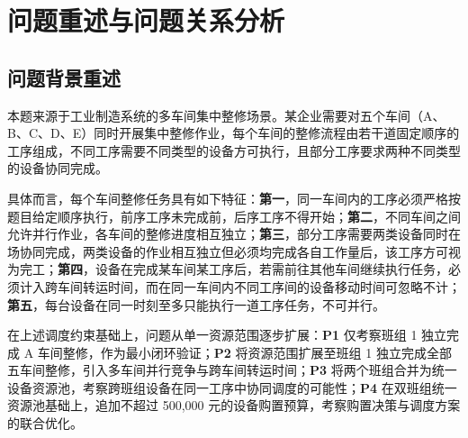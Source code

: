 \documentclass[UTF8,a4paper,12pt]{ctexart}
\newcommand{\papertitle}[1]{%
  \begin{center}
    {\heiti\zihao{3} #1}
  \end{center}
  \vspace{1em}
}
\begin{document}






\section{问题重述与问题关系分析}

\subsection{问题背景重述}
本题来源于工业制造系统的多车间集中整修场景。某企业需要对五个车间（A、B、C、D、E）同时开展集中整修作业，每个车间的整修流程由若干道固定顺序的工序组成，不同工序需要不同类型的设备方可执行，且部分工序要求两种不同类型的设备协同完成。

具体而言，每个车间整修任务具有如下特征：\textbf{第一}，同一车间内的工序必须严格按题目给定顺序执行，前序工序未完成前，后序工序不得开始；\textbf{第二}，不同车间之间允许并行作业，各车间的整修进度相互独立；\textbf{第三}，部分工序需要两类设备同时在场协同完成，两类设备的作业相互独立但必须均完成各自工作量后，该工序方可视为完工；\textbf{第四}，设备在完成某车间某工序后，若需前往其他车间继续执行任务，必须计入跨车间转运时间，而在同一车间内不同工序间的设备移动时间可忽略不计；\textbf{第五}，每台设备在同一时刻至多只能执行一道工序任务，不可并行。

在上述调度约束基础上，问题从单一资源范围逐步扩展：\textbf{P1} 仅考察班组 1 独立完成 A 车间整修，作为最小闭环验证；\textbf{P2} 将资源范围扩展至班组 1 独立完成全部五车间整修，引入多车间并行竞争与跨车间转运时间；\textbf{P3} 将两个班组合并为统一设备资源池，考察跨班组设备在同一工序中协同调度的可能性；\textbf{P4} 在双班组统一资源池基础上，追加不超过 500,000 元的设备购置预算，考察购置决策与调度方案的联合优化。
\end{document}
